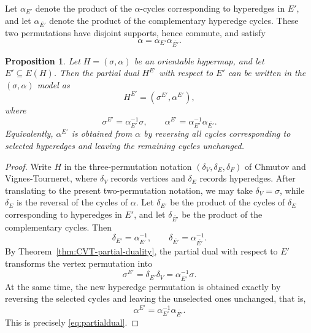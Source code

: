 \documentclass{article}
\newtheorem{proposition}[theorem]{Proposition}
\begin{document}
 
Let $\alpha_{E'}$ denote the product of the $\alpha$-cycles corresponding to hyperedges in $E'$, and let $\alpha_{\overline{E'}}$ denote the product of the complementary hyperedge cycles. These two permutations have disjoint supports, hence commute, and satisfy
\[
\alpha=\alpha_{E'}\alpha_{\overline{E'}}.
\]

\begin{proposition}\label{prop:partialdual}
Let $H=(\sigma,\alpha)$ be an orientable hypermap, and let $E'\subseteq E(H)$. Then the partial dual $H^{E'}$ with respect to $E'$ can be written in the $(\sigma,\alpha)$ model as
\[
H^{E'}=(\sigma^{E'},\alpha^{E'}),
\]
where
\begin{equation}\label{eq:partialdual}
\sigma^{E'}=\alpha_{E'}^{-1}\sigma,
\qquad
\alpha^{E'}=\alpha_{E'}^{-1}\alpha_{\overline{E'}}.
\end{equation}
Equivalently, $\alpha^{E'}$ is obtained from $\alpha$ by reversing all cycles corresponding to selected hyperedges and leaving the remaining cycles unchanged.
\end{proposition}

\begin{proof}
Write $H$ in the three-permutation notation $(\delta_V,\delta_E,\delta_F)$ of Chmutov and Vignes-Tourneret, where $\delta_V$ records vertices and $\delta_E$ records hyperedges. After translating to the present two-permutation notation, we may take $\delta_V=\sigma$, while $\delta_E$ is the reversal of the cycles of $\alpha$. Let $\delta_{E'}$ be the product of the cycles of $\delta_E$ corresponding to hyperedges in $E'$, and let $\delta_{\overline{E'}}$ be the product of the complementary cycles. Then
\[
\delta_{E'}=\alpha_{E'}^{-1},
\qquad
\delta_{\overline{E'}}=\alpha_{\overline{E'}}^{-1}.
\]
By Theorem~\ref{thm:CVT-partial-duality}, the partial dual with respect to $E'$ transforms the vertex permutation into
\[
\sigma^{E'}=\delta_{E'}\delta_V=\alpha_{E'}^{-1}\sigma.
\]
At the same time, the new hyperedge permutation is obtained exactly by reversing the selected cycles and leaving the unselected ones unchanged, that is,
\[
\alpha^{E'}=\alpha_{E'}^{-1}\alpha_{\overline{E'}}.
\]
This is precisely \eqref{eq:partialdual}.
\end{proof}
\end{document}
